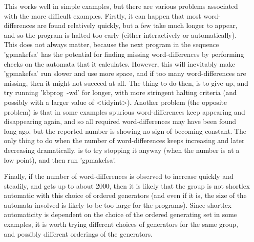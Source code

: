 This works well in simple examples, but there are various problems
associated with the more difficult examples. Firstly, it can happen that
most word-differences are found relatively quickly, but a few take much longer
to appear, and so the program is halted too early (either interactively or
automatically). This does not always matter, because the next program in
the sequence 'gpmakefsa' has the potential for finding missing word-differences
by performing checks on the automata that it calculates. However, this
will inevitably make 'gpmakefsa' run slower and use more space, and if too
many word-differences are missing, then it might not succeed at all. The thing
to do then, is to give up, and try running 'kbprog\ -wd' for longer, with more
stringent halting criteria (and possibly with a larger value of <tidyint>).
Another problem (the opposite problem) is that in some examples spurious
word-differences keep appearing and disappearing again, and so all required
word-differences may have been found long ago, but the reported number is
showing no sign of becoming constant. The only thing to do
when the number of word-differences keeps increasing and later decreasing
dramatically, is to try stopping it anyway (when the number is at
a low point), and then run 'gpmakefsa'.

Finally, if the number of word-differences is observed to increase quickly and
steadily, and gets up to about 2000, then it is likely that the group is not
shortlex automatic with this choice of ordered generators (and even if it is,
the size of the automata involved is likely to be too large for the
programs). Since shortlex automaticity is dependent on the choice of the
ordered generating set in some examples, it is worth trying different
choices of generators for the same group, and possibly different orderings
of the generators.

